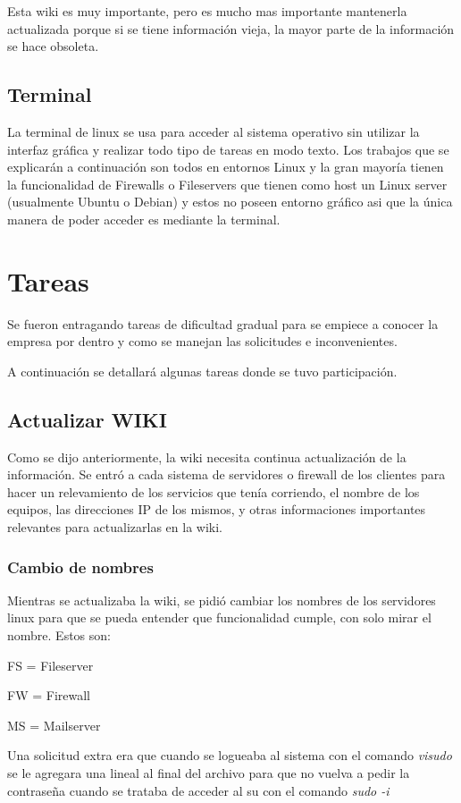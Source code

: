 \documentclass[12pt,a4paper]{article}
\begin{document}
Esta wiki es muy importante, pero es mucho mas importante mantenerla actualizada porque si se tiene información vieja, la mayor parte de la información se hace obsoleta. 

\subsection{Terminal}
La terminal de linux se usa para acceder al sistema operativo sin utilizar la interfaz gráfica y realizar todo tipo de tareas en modo texto. Los trabajos que se explicarán a continuación son todos en entornos Linux y la gran mayoría tienen la funcionalidad de Firewalls o Fileservers que tienen como host un Linux server (usualmente Ubuntu o Debian) y estos no poseen entorno gráfico asi que la única manera de poder acceder es mediante la terminal.

\section{Tareas}
Se fueron entragando tareas de dificultad gradual para se empiece a conocer la empresa por dentro y como se manejan las solicitudes e inconvenientes.

A continuación se detallará algunas tareas donde se tuvo participación.

\subsection{Actualizar WIKI}
Como se dijo anteriormente, la wiki necesita continua actualización de la información. Se entró a cada sistema de servidores o firewall de los clientes para hacer un relevamiento de los servicios que tenía corriendo, el nombre de los equipos, las direcciones IP de los mismos, y otras informaciones importantes relevantes para actualizarlas en la wiki. 

\subsubsection{Cambio de nombres}
Mientras se actualizaba la wiki, se pidió cambiar los nombres de los servidores linux para que se pueda entender que funcionalidad cumple, con solo mirar el nombre. Estos son:

FS = Fileserver

FW = Firewall

MS = Mailserver

Una solicitud extra era que cuando se logueaba al sistema con el comando \textit{visudo} se le agregara una lineal al final del archivo para que no vuelva a pedir la contraseña cuando se trataba de acceder al su con el comando \textit{sudo -i} 
\end{document}
